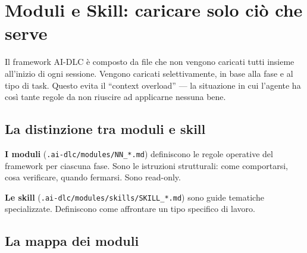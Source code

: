 ﻿%

\chapter{Moduli e Skill: caricare solo ciò che serve}
\label{ch:moduli-e-skill}

Il framework AI-DLC è composto da file che non vengono caricati tutti insieme all'inizio di ogni sessione. Vengono caricati selettivamente, in base alla fase e al tipo di task. Questo evita il ``context overload'' --- la situazione in cui l'agente ha così tante regole da non riuscire ad applicarne nessuna bene.

\section{La distinzione tra moduli e skill}
\label{sec:12-distinzione}

\textbf{I moduli} (\texttt{.ai-dlc/modules/NN\_*.md}) definiscono le regole operative del framework per ciascuna fase. Sono le istruzioni strutturali: come comportarsi, cosa verificare, quando fermarsi. Sono read-only.

\textbf{Le skill} (\texttt{.ai-dlc/modules/skills/SKILL\_*.md}) sono guide tematiche specializzate. Definiscono come affrontare un tipo specifico di lavoro.

\section{La mappa dei moduli}
\label{sec:12-mappa-moduli}

